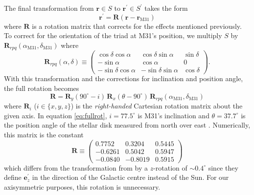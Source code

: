 \documentclass[preprint]{aastex}
\newcommand{\eqlabel}[1]{\label{eq:#1}}
\newcommand{\eq}[1]{equation \ref{eq:#1}}
\begin{document}
The final transformation from $\mathbf{r} \in S$ to $\mathbf{r}^\prime \in S^\prime$ takes the form
\begin{equation}
    \mathbf{r}^\prime = \mathbf{R}(\mathbf{r} - \mathbf{r}_\mathrm{M31})
\end{equation}
where $\mathbf{R}$ is a rotation matrix that corrects for the effects mentioned previously.  To correct for the orientation of the triad at M31's position, we multiply $S$ by $\mathbf{R}_{rpq} (\alpha_\mathrm{M31}, \delta_\mathrm{M31})$ where
\begin{equation}
    \eqlabel{triad}
    \mathbf{R}_{rpq} (\alpha, \delta) \equiv \left ( \begin{array}{ccc}
    \cos \delta \cos \alpha & \cos \delta \sin \alpha & \sin \delta \\
    -\sin \alpha & \cos \alpha & 0 \\
    -\sin \delta \cos \alpha & -\sin \delta \sin \alpha & \cos \delta
    \end{array} \right ).
\end{equation}
With this transformation and the corrections for inclination and position angle, the full rotation becomes
\begin{equation}
    \eqlabel{fullrot}
    \mathbf{R} = \mathbf{R}_y (90^\circ - i) \, \mathbf{R}_x (\theta - 90^\circ) \, \mathbf{R}_{rpq} (\alpha_\mathrm{M31}, \delta_\mathrm{M31})
\end{equation}
where $\mathbf{R}_i$ ($i\in \{x,y,z\}$) is the \emph{right-handed} Cartesian rotation matrix about the given axis.  In \eq{fullrot}, $i = 77.5^\circ$ is M31's inclination and $\theta = 37.7^\circ$ is the position angle of the stellar disk measured from north over east \citep{de-Vaucouleurs:1958}.  Numerically, this matrix is the constant
\begin{equation}
    \eqlabel{fullrotation}
    \mathbf{R} \equiv \left ( \begin{array}{ccc}
0.7752 & 0.3204 & 0.5445 \\
-0.6261 & 0.5042 & 0.5947 \\
-0.0840 & -0.8019 & 0.5915
\end{array} \right )
\end{equation}
which differs from the transformation from \citet{Metz:2007} by a $z$-rotation of $\sim 0.4^\circ$ since they define $\mathbf{e}_z^\prime$ in the direction of the Galactic centre instead of the Sun.  For our axisymmetric purposes, this rotation is unnecessary.
\end{document}
